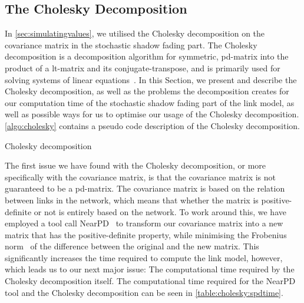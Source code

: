 \subsection{The Cholesky Decomposition}\label{sec:cholesky}
In \autoref{sec:simulatingvalues}, we utilised the Cholesky decomposition on the covariance matrix in the stochastic shadow fading part. The Cholesky decomposition is a decomposition algorithm for \gls{symmetric}, \gls{pd-matrix} into the product of a \gls{lt-matrix} and its \gls{conjugate-transpose}, and is primarily used for solving systems of linear equations~\cite{Press:2007:NRE:1403886}. In this Section, we present and describe the Cholesky decomposition, as well as the problems the decomposition creates for our computation time of the stochastic shadow fading part of the link model, as well as possible ways for us to optimise our usage of the Cholesky decomposition. \autoref{algo:cholesky} contains a pseudo code description of the Cholesky decomposition. \medbreak

\begin{algorithm}[H]
    \DontPrintSemicolon
    \caption{Cholesky decomposition}
    \label{algo:cholesky}
\end{algorithm}
\medbreak
The first issue we have found with the Cholesky decomposition, or more specifically with the covariance matrix, is that the covariance matrix is not guaranteed to be a \gls{pd-matrix}. The covariance matrix is based on the relation between links in the network, which means that whether the matrix is positive-definite or not is entirely based on the network. To work around this, we have employed a tool call NearPD~\cite{website:nearPD} to transform our covariance matrix into a new matrix that has the positive-definite property, while minimising the Frobenius norm~\cite{website:frobieniusnorm} of the difference between the original and the new matrix. This significantly increases the time required to compute the link model, however, which leads us to our next major issue: The computational time required by the Cholesky decomposition itself. The computational time required for the NearPD tool and the Cholesky decomposition can be seen in \autoref{table:cholesky:spdtime}.\smallbreak

